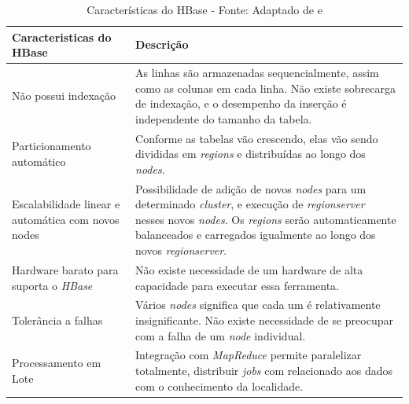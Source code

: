             \begin{table}[!ht]
            \begin{center}
              \begin{tabular}{|p{8cm}|p{8cm}|}
                \hline
                Caracteristicas do HBase & Descrição
                \\ \hline
                Não possui indexação & As linhas são armazenadas sequencialmente,
                                                        assim como as colunas em cada linha. Não existe
                                                        sobrecarga de indexação, e o desempenho da
                                                        inserção é independente do tamanho da tabela.
                \\ \hline
                Particionamento automático & Conforme as tabelas vão crescendo, elas vão sendo divididas em
                                                                    \textit{regions} e distribuídas ao longo dos \textit{nodes}.
                \\ \hline
                Escalabilidade linear e automática com novos nodes & Possibilidade de adição de novos \textit{nodes} para um
                                                                                                          determinado \textit{cluster}, e execução de \textit{regionserver}
                                                                                                          nesses novos \textit{nodes}. Os \textit{regions} serão
                                                                                                          automaticamente balanceados e carregados igualmente ao longo
                                                                                                          dos novos \textit{regionserver}.
                \\ \hline
                Hardware barato para suporta o \textit{HBase} & Não existe necessidade de um hardware de alta capacidade
                                                                                                  para executar essa ferramenta.
                \\ \hline
                Tolerância a falhas & Vários \textit{nodes} significa que cada um é relativamente insignificante. Não existe
                                                    necessidade de se preocupar com a falha de um \textit{node} individual.
                \\ \hline
                Processamento em Lote & Integração com \textit{MapReduce} permite paralelizar totalmente,
                                                            distribuir \textit{jobs} com relacionado aos dados com o conhecimento da localidade.
                \\ \hline
              \end{tabular}
              \caption[Características do HBase]{Características do HBase -
              \protect Fonte: Adaptado de  e }
            \label{tabela1}
            \end{center}
            \end{table}

